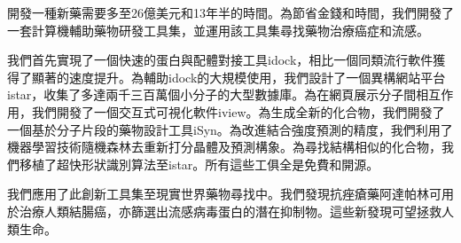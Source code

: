 開發一種新藥需要多至26億美元和13年半的時間。為節省金錢和時間，我們開發了一套計算機輔助藥物研發工具集，並運用該工具集尋找藥物治療癌症和流感。

我們首先實現了一個快速的蛋白與配體對接工具idock，相比一個同類流行軟件獲得了顯著的速度提升。為輔助idock的大規模使用，我們設計了一個異構網站平台istar，收集了多達兩千三百萬個小分子的大型數據庫。為在網頁展示分子間相互作用，我們開發了一個交互式可視化軟件iview。為生成全新的化合物，我們開發了一個基於分子片段的藥物設計工具iSyn。為改進結合強度預測的精度，我們利用了機器學習技術隨機森林去重新打分晶體及預測構象。為尋找結構相似的化合物，我們移植了超快形狀識別算法至istar。所有這些工俱全是免費和開源。

我們應用了此創新工具集至現實世界藥物尋找中。我們發現抗痤瘡藥阿達帕林可用於治療人類結腸癌，亦篩選出流感病毒蛋白的潛在抑制物。這些新發現可望拯救人類生命。
